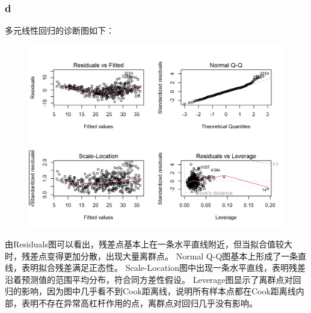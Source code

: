 \documentclass[12pt,a4paper]{article}
\begin{document}
    \subsubsection*{d}
    多元线性回归的诊断图如下：
    \begin{figure}[H]
        \centering
        \includegraphics[scale=0.75]{Diagnostic.png}
    \end{figure}
    由Residuals图可以看出，残差点基本上在一条水平直线附近，但当拟合值较大时，残差点变得更加分散，出现大量离群点。
    Normal Q-Q图基本上形成了一条直线，表明拟合残差满足正态性。
    Scale-Location图中出现一条水平直线，表明残差沿着预测值的范围平均分布，符合同方差性假设。
    Leverage图显示了离群点对回归的影响，因为图中几乎看不到Cook距离线，说明所有样本点都在Cook距离线内部，表明不存在异常高杠杆作用的点，离群点对回归几乎没有影响。
\end{document}
